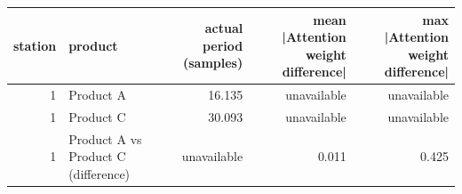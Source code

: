\begin{tabular}{rlrrr}
\toprule
station & product & actual period (samples) & mean |Attention weight difference| & max |Attention weight difference| \\
\midrule
1 & Product A & 16.135 & unavailable & unavailable \\
1 & Product C & 30.093 & unavailable & unavailable \\
1 & Product A vs Product C (difference) & unavailable & 0.011 & 0.425 \\
\bottomrule
\end{tabular}

